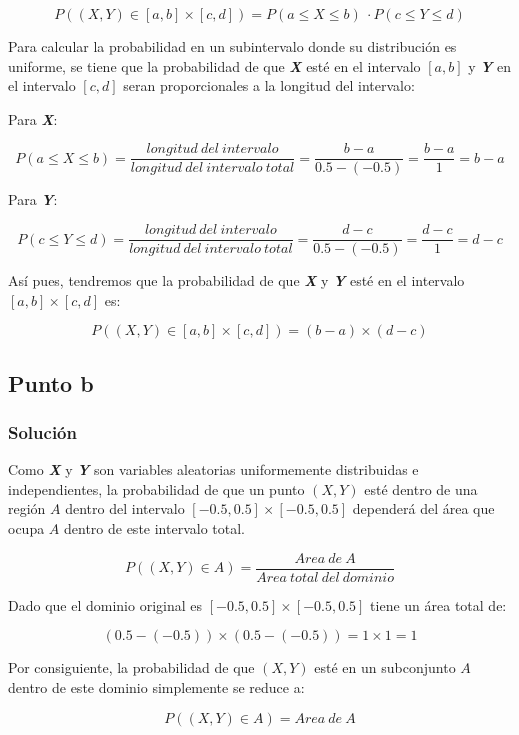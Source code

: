 \documentclass[12pt]{article}
\begin{document}
\[P((X,Y) \in [a,b]\times[c,d]) = P(a\leq X \leq b)\ \cdot P(c\leq Y \leq d)\]

Para calcular la probabilidad en un subintervalo donde su distribución es uniforme, se tiene que la probabilidad de que \textit{\textbf{X}} esté en el intervalo $[a,b]$ y \textit{\textbf{Y}} en el intervalo $[c,d]$ seran proporcionales a la longitud del intervalo:

Para \textit{\textbf{X}}:

\[P(a \leq X \leq b) = \frac{longitud\ del\ intervalo}{longitud\ del\ intervalo\  total} = \frac{b-a}{0.5-(-0.5)} = \frac{b-a}{1} = b-a\]

Para \textit{\textbf{Y}}:

\[P(c \leq Y \leq d) = \frac{longitud\ del\ intervalo}{longitud\ del\ intervalo\  total} = \frac{d-c}{0.5-(-0.5)} = \frac{d-c}{1} = d-c\]


Así pues, tendremos que la probabilidad de que \textit{\textbf{X}} y \textit{\textbf{Y}} esté en el intervalo $[a,b] \times [c,d]$ es:

\[P((X,Y) \in [a,b] \times [c,d]) = (b-a) \times (d-c)\]



\subsection{Punto b}


\subsubsection{Solución}

Como \textit{\textbf{X}} y \textit{\textbf{Y}} son variables aleatorias uniformemente distribuidas e independientes, la probabilidad de que un punto \textit{$(X,Y)$} esté dentro de una región \textbf{$A$} dentro del intervalo $[-0.5,0.5] \times [-0.5,0.5]$ dependerá del área que ocupa \textbf{$A$} dentro de este intervalo total.

\[P((X,Y) \in A) = \frac{Area\ de\ A}{Area\ total\ del\ dominio}\]

Dado que el dominio original es $[-0.5, 0.5] \times [-0.5,0.5]$ tiene un área total de:

\[(0.5-(-0.5)) \times (0.5-(-0.5))=1\times1=1\]

Por consiguiente, la probabilidad de que \textit{$(X,Y)$} esté en un subconjunto \textbf{$A$} dentro de este dominio simplemente se reduce a:

\[P((X,Y) \in A) = Area\ de\ A\]
\end{document}
